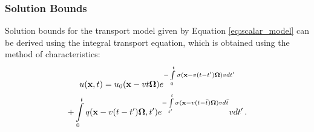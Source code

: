 
\subsubsection{Solution Bounds}\label{sec:solution_bounds}

Solution bounds for the transport model given by Equation \eqref{eq:scalar_model}
can be derived using the integral transport equation, which is obtained using
the method of characteristics:
\begin{multline}\label{eq:integral_transport}
   u(\mathbf{x},t) = u_0(\mathbf{x} - v t\mathbf{\Omega}) e^{-\int\limits_0^t
    \sigma(\mathbf{x} - v(t -t')\mathbf{\Omega})v dt'}\\
    + \int\limits_0^t q(\mathbf{x} - v(t -t')\mathbf{\Omega},t') e^{-\int\limits_{t'}^t
    \sigma(\mathbf{x} - v(t -\bar{t})\mathbf{\Omega})v d\bar{t}} v dt' \,.
\end{multline}

